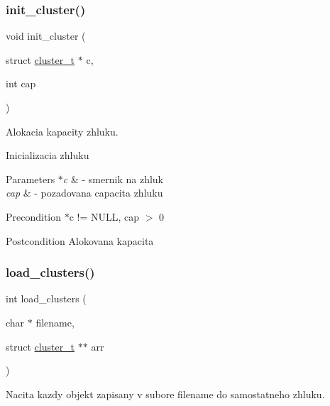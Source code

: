 \subsubsection{\texorpdfstring{init\+\_\+cluster()}{init\_cluster()}}
{\footnotesize\ttfamily void init\+\_\+cluster (\begin{DoxyParamCaption}\item[{struct \hyperlink{structcluster__t}{cluster\+\_\+t} $\ast$}]{c,  }\item[{int}]{cap }\end{DoxyParamCaption})}



Alokacia kapacity zhluku. 

Inicializacia zhluku 
\begin{DoxyParams}{Parameters}
{\em $\ast$c} & -\/ smernik na zhluk \\
\hline
{\em cap} & -\/ pozadovana capacita zhluku \\
\hline
\end{DoxyParams}
\begin{DoxyPrecond}{Precondition}
$\ast$c != N\+U\+LL, cap $>$ 0 
\end{DoxyPrecond}
\begin{DoxyPostcond}{Postcondition}
Alokovana kapacita 
\end{DoxyPostcond}
\hypertarget{group___praca_ga9d928923d43120cb53ddff210a087061}{}\label{group___praca_ga9d928923d43120cb53ddff210a087061} 
\subsubsection{\texorpdfstring{load\+\_\+clusters()}{load\_clusters()}}
{\footnotesize\ttfamily int load\+\_\+clusters (\begin{DoxyParamCaption}\item[{char $\ast$}]{filename,  }\item[{struct \hyperlink{structcluster__t}{cluster\+\_\+t} $\ast$$\ast$}]{arr }\end{DoxyParamCaption})}



Nacita kazdy objekt zapisany v subore filename do samostatneho zhluku. 


